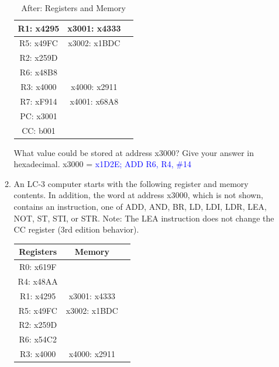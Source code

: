 \documentclass{article}
\begin{document}
\begin{enumerate}[label=(\alph*)]
\begin{enumerate}[label=(\roman*)]
\begin{table}[h]
\begin{tabular}{|c|c|c|}
            \hline
            R1: x4295 & x3001: x4333 & \\
            \hline
            R5: x49FC & x3002: x1BDC & \\
            \hline
            R2: x259D & & \\
            \hline
            R6: x48B8 & & \\
            \hline
            R3: x4000 & x4000: x2911 & \\
            \hline
            R7: xF914 & x4001: x68A8 & \\
            \hline
            PC: x3001 & & \\
            \hline
            CC: b001 & & \\
            \hline
            \end{tabular}
            \caption{After: Registers and Memory}
            \end{table}
            \newline
            What value could be stored at address x3000? Give your answer in hexadecimal.
            \newline
            \newline
            x3000 = \textcolor{blue}{x1D2E; ADD R6, R4, \#14}
        \newpage
        \item An LC-3 computer starts with the following register and memory contents. In addition, the word at address x3000, which is not shown, contains an instruction, one of ADD, AND, BR, LD, LDI, LDR, LEA, NOT, ST, STI, or STR. Note: The LEA instruction does not change the CC register (3rd edition behavior).
            \begin{table}[h]
            \centering
            \begin{tabular}{|c|c|c|}
            \hline
            \textbf{Registers} & \textbf{Memory} & \\
            \hline
            R0: x619F & & \\
            \hline
            R4: x48AA & & \\
            \hline
            R1: x4295 & x3001: x4333 & \\
            \hline
            R5: x49FC & x3002: x1BDC & \\
            \hline
            R2: x259D & & \\
            \hline
            R6: x54C2 & & \\
            \hline
            R3: x4000 & x4000: x2911 & \\
            \hline

\end{tabular}
\end{table}
\end{enumerate}
\end{enumerate}
\end{document}

